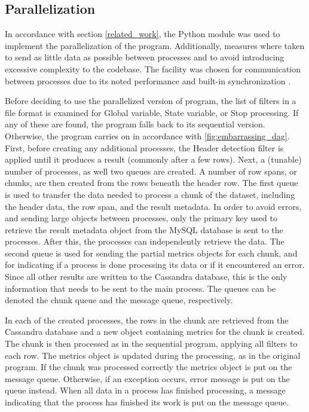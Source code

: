 \subsection{Parallelization} %
In accordance with section \ref{related_work}, the Python  module was used to implement the parallelization of the program. Additionally, measures where taken to send as little
data as possible between processes and to avoid introducing excessive complexity to the codebase. The  facility was chosen for communication between processes due to its
noted performance and built-in synchronization \cite{singh_2013_parallel_padpwprfmm}.

Before deciding to use the parallelized version of program, the list of filters in a file format is examined for Global variable, State variable, or Stop processing. If any of these are found, the
program falls back to its sequential version. Otherwise, the program carries on in accordance with \ref{fig:embarrassing_dag}. First, before creating any additional processes, the Header detection filter
is applied until it produces a result (commonly after a few rows). Next, a (tunable) number of processes, as well two queues are created. A number of row spans, or chunks, are then created from the rows beneath
the header row. The first queue is used to transfer the data needed to process a chunk of the dataset, including the header data, the row span, and the result metadata. In order to avoid errors, and sending large
objects between processes, only the primary key used to retrieve the result metadata object from the MySQL database is sent to the processes. After this, the processes can independently retrieve the data. The second
queue is used for sending the partial metrics objects for each chunk, and for indicating if a process is done processing its data or if it encountered an error. Since all other results are written to the Cassandra
database, this is the only information that needs to be sent to the main process. The queues can be denoted the chunk queue and the message queue, respectively.

In each of the created processes, the rows in the chunk are retrieved from the Cassandra database and a new object containing metrics for the chunk is created. The chunk is then processed as in the sequential program,
applying all filters to each row. The metrics object is updated during the processing, as in the original program. If the chunk was processed correctly the metrics object is put on the message queue. Otherwise,
if an exception occurs, error message is put on the queue instead. When all data in a process has finished processing, a message indicating that the process has finished its work is put on the message queue.

